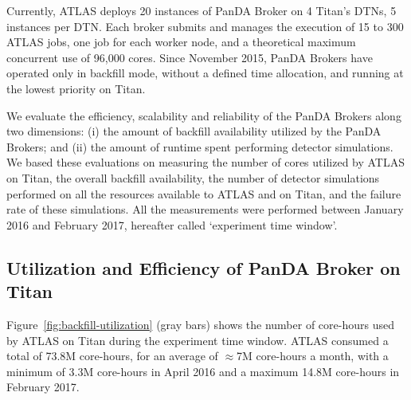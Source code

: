 Currently, ATLAS deploys 20 instances of PanDA Broker on 4 Titan's DTNs, 5
instances per DTN. Each broker submits and manages the execution of 15 to 300
ATLAS jobs, one job for each worker node, and a theoretical maximum concurrent
use of 96,000 cores. Since November 2015, PanDA Brokers have operated only in
backfill mode, without a defined time allocation, and running at the lowest
priority on Titan.

We evaluate the efficiency, scalability and reliability of the PanDA Brokers
along two dimensions: (i) the amount of backfill availability utilized by the
PanDA Brokers; and (ii) the amount of runtime spent performing detector
simulations. We based these evaluations on measuring the number of cores
utilized by ATLAS on Titan, the overall backfill availability, the number of
detector simulations performed on all the resources available to ATLAS and on
Titan, and the failure rate of these simulations. All the measurements were
performed between January 2016 and February 2017, hereafter called `experiment
time window'.


\subsection{Utilization and Efficiency of PanDA Broker on Titan}
\label{ssec:panda_titan}

Figure~\ref{fig:backfill-utilization} (gray bars) shows the number of core-hours
used by ATLAS on Titan during the experiment time window. ATLAS consumed a total
of 73.8M core-hours, for an average of $\approx$7M core-hours a month, with a
minimum of 3.3M core-hours in April 2016 and a maximum 14.8M core-hours in
February 2017.

%


